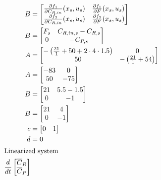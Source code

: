 \documentclass[12pt]{article}
\begin{document}
\begin{enumerate}
\begin{enumerate}
\begin{align*}
        B &= \begin{bmatrix}
            \frac{\partial f_1}{\partial C_{R,in}}(x_s, u_s) & \frac{\partial f_1}{\partial F}(x_s, u_s) \\
            \frac{\partial f_2}{\partial C_{R,in}}(x_s, u_s) & \frac{\partial f_2}{\partial F}(x_s, u_s) \\
        \end{bmatrix} \\
        B &= \begin{bmatrix}
            F_s & C_{R,in,s} - C_{R,s} \\
            0 & -C_{P,s} \\
        \end{bmatrix} \\
        A &= \begin{bmatrix}
            -\left(\frac{21}{1} + 50 + 2 \cdot 4  \cdot 1.5 \right) & 0 \\
            50 & -\left(\frac{21}{1} + 54\right) \\
        \end{bmatrix} \\
        A &= \begin{bmatrix}
            -83 & 0 \\
            50 & -75 \\
        \end{bmatrix} \\
        B &= \begin{bmatrix}
            21 & 5.5 - 1.5 \\
            0 & -1 \\
        \end{bmatrix} \\
        B &= \begin{bmatrix}
            21 & 4 \\
            0 & -1 \\
        \end{bmatrix} \\
        c &= \begin{bmatrix}
            0 & 1 \\
        \end{bmatrix} \\
        d &= 0 \\
        \intertext{Linearized system}
        \frac{d}{dt} \begin{bmatrix}
            \overline{C}_R \\
            \overline{C}_P \\

\end{bmatrix}
\end{align*}
\end{enumerate}
\end{enumerate}
\end{document}
